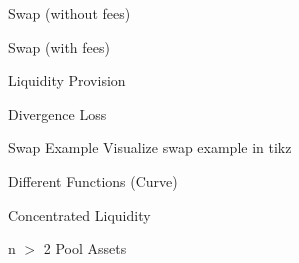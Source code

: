\documentclass[]{beamer}
\begin{document}
\begin{frame}{Swap (without fees)}
	\only<1>{
		\begin{figure}[h!]
			\begin{center}
				
			\end{center}
		\end{figure}
	}


\end{frame}


\begin{frame}{Swap (with fees)}
	
\end{frame}


\begin{frame}{Liquidity Provision}

\end{frame}


\begin{frame}{Divergence Loss}

\end{frame}


\begin{frame}{Swap Example}
Visualize swap example in tikz
\end{frame}


\begin{frame}{Different Functions (Curve)}

\end{frame}


\begin{frame}{Concentrated Liquidity}

\end{frame}


\begin{frame}{n $>$ 2 Pool Assets}

\end{frame}
\end{document}
